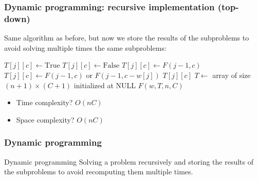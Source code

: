 \documentclass{beamer}
\begin{document}
\begin{frame}
  \frametitle{Dynamic programming: recursive implementation (top-down)}

  \footnotesize
  Same algorithm as before, but now we store the results of the subproblems to avoid solving multiple times the same subproblems:
  \begin{minipage}[t]{0.75\linewidth}
    \footnotesize
    \begin{algorithmic}
      \State$T[j][c] \gets \text{True}$
      \Else{}
      \State$T[j][c] \gets \text{False}$
      \EndIf
      \State$T[j][c] \gets F(j - 1, c)$
      \Else{}
      \State$T[j][c] \gets F(j - 1, c) \text{ or } F(j - 1, c - w[j])$
      \EndIf
      \EndIf
      \State\Return$T[j][c]$
      \EndProcedure{}
      \State$T \gets$ array of size $(n + 1) \times (C + 1)$ initialized at NULL
      \State\Return$F(w, T, n, C)$
      \EndProcedure{}
    \end{algorithmic}
  \end{minipage}
  \hfill
  \begin{minipage}[t]{0.24\linewidth}
    \footnotesize
    \begin{itemize}
      \item \pause Time complexity? \pause $O(nC)$
      \item \pause Space complexity? \pause $O(nC)$
    \end{itemize}
  \end{minipage}
\end{frame}

\begin{frame}
  \frametitle{Dynamic programming}

  \begin{block}{Dynamic programming}
    Solving a problem recursively and storing the results of the subproblems to avoid recomputing them multiple times.
  \end{block}
\end{frame}
\end{document}
